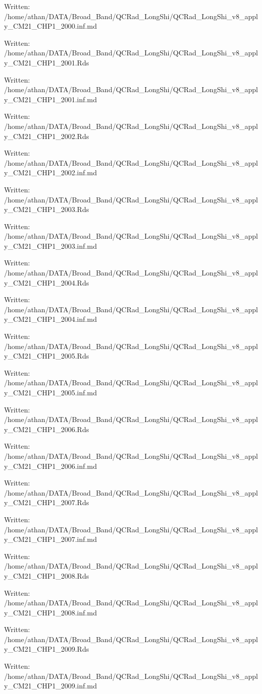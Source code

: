 \documentclass[
  10pt,
  a4paper,oneside]{article}
\begin{document}
Written: /home/athan/DATA/Broad\_Band/QCRad\_LongShi/QCRad\_LongShi\_v8\_apply\_CM21\_CHP1\_2000.inf.md

Written: /home/athan/DATA/Broad\_Band/QCRad\_LongShi/QCRad\_LongShi\_v8\_apply\_CM21\_CHP1\_2001.Rds

Written: /home/athan/DATA/Broad\_Band/QCRad\_LongShi/QCRad\_LongShi\_v8\_apply\_CM21\_CHP1\_2001.inf.md

Written: /home/athan/DATA/Broad\_Band/QCRad\_LongShi/QCRad\_LongShi\_v8\_apply\_CM21\_CHP1\_2002.Rds

Written: /home/athan/DATA/Broad\_Band/QCRad\_LongShi/QCRad\_LongShi\_v8\_apply\_CM21\_CHP1\_2002.inf.md

Written: /home/athan/DATA/Broad\_Band/QCRad\_LongShi/QCRad\_LongShi\_v8\_apply\_CM21\_CHP1\_2003.Rds

Written: /home/athan/DATA/Broad\_Band/QCRad\_LongShi/QCRad\_LongShi\_v8\_apply\_CM21\_CHP1\_2003.inf.md

Written: /home/athan/DATA/Broad\_Band/QCRad\_LongShi/QCRad\_LongShi\_v8\_apply\_CM21\_CHP1\_2004.Rds

Written: /home/athan/DATA/Broad\_Band/QCRad\_LongShi/QCRad\_LongShi\_v8\_apply\_CM21\_CHP1\_2004.inf.md

Written: /home/athan/DATA/Broad\_Band/QCRad\_LongShi/QCRad\_LongShi\_v8\_apply\_CM21\_CHP1\_2005.Rds

Written: /home/athan/DATA/Broad\_Band/QCRad\_LongShi/QCRad\_LongShi\_v8\_apply\_CM21\_CHP1\_2005.inf.md

Written: /home/athan/DATA/Broad\_Band/QCRad\_LongShi/QCRad\_LongShi\_v8\_apply\_CM21\_CHP1\_2006.Rds

Written: /home/athan/DATA/Broad\_Band/QCRad\_LongShi/QCRad\_LongShi\_v8\_apply\_CM21\_CHP1\_2006.inf.md

Written: /home/athan/DATA/Broad\_Band/QCRad\_LongShi/QCRad\_LongShi\_v8\_apply\_CM21\_CHP1\_2007.Rds

Written: /home/athan/DATA/Broad\_Band/QCRad\_LongShi/QCRad\_LongShi\_v8\_apply\_CM21\_CHP1\_2007.inf.md

Written: /home/athan/DATA/Broad\_Band/QCRad\_LongShi/QCRad\_LongShi\_v8\_apply\_CM21\_CHP1\_2008.Rds

Written: /home/athan/DATA/Broad\_Band/QCRad\_LongShi/QCRad\_LongShi\_v8\_apply\_CM21\_CHP1\_2008.inf.md

Written: /home/athan/DATA/Broad\_Band/QCRad\_LongShi/QCRad\_LongShi\_v8\_apply\_CM21\_CHP1\_2009.Rds

Written: /home/athan/DATA/Broad\_Band/QCRad\_LongShi/QCRad\_LongShi\_v8\_apply\_CM21\_CHP1\_2009.inf.md
\end{document}
